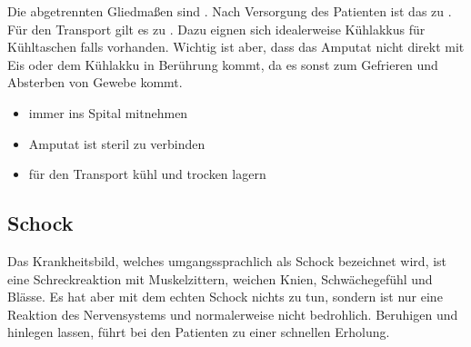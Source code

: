 \clearpage
{}
{
Die abgetrennten Gliedmaßen sind . Nach
Versorgung des Patienten ist das  zu . Für
den Transport gilt es  zu . Dazu eignen
sich idealerweise Kühlakkus für Kühltaschen falls vorhanden. Wichtig ist aber,
dass das Amputat  nicht direkt mit Eis oder dem Kühlakku in Berührung
kommt, da es sonst zum Gefrieren und Absterben von Gewebe kommt.
}{
\begin{itemize}
  \item immer ins Spital mitnehmen
  \item Amputat ist steril zu verbinden
  \item für den Transport kühl und trocken lagern
\end{itemize}
}{}{}{}




\subsection{Schock}
\label{topic:schock-ehi}



Das Krankheitsbild, welches umgangssprachlich als Schock
bezeichnet wird, ist eine Schreckreaktion mit Muskelzittern,
weichen Knien, Schwächegefühl und Blässe. Es hat aber mit
dem echten Schock nichts zu tun, sondern ist nur eine
Reaktion des Nervensystems und normalerweise nicht
bedrohlich. Beruhigen und hinlegen lassen, führt bei den
Patienten zu einer schnellen Erholung.

